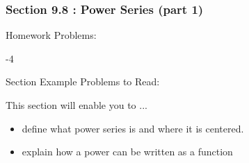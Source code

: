 %
%

\begin{frame}
\frametitle{\LARGE {\color[rgb]{0.02,0.20,1.0} Section 9.8 : Power Series (part 1)}}
\vspace{0.8cm}
\begin{block}{Homework Problems:}

\vspace{0.2cm}
-4
	
\end{block}
\vspace{0.5cm}

\begin{block}{Section Example Problems to Read:}

\vspace{0.2cm}
	
\end{block}
\vspace{0.2cm}

\begin{block}{This section will enable you to ...}
\begin{itemize}
	\item[...] define what power series is and where it is centered.
	\item[...] explain how a power can be written as a function
\end{itemize}
\end{block}
\vspace{3.0cm}
\end{frame}

